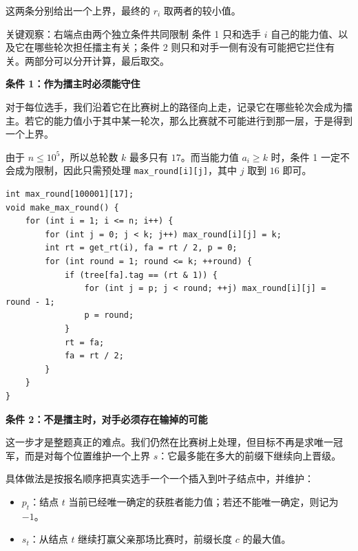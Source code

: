\documentclass{book}
\newcommand{\code}[1]{\colorbox{codebg}{\texttt{#1}}}  %
\begin{document}
    这两条分别给出一个上界，最终的 $r_i$ 取两者的较小值。

    \begin{keybox}{关键观察：右端点由两个独立条件共同限制}
    条件 1 只和选手 $i$ 自己的能力值、以及它在哪些轮次担任擂主有关；条件 2 则只和对手一侧有没有可能把它拦住有关。两部分可以分开计算，最后取交。
    \end{keybox}

    \par\medskip
    \noindent\textbf{条件 1：作为擂主时必须能守住}
    \par\medskip

    对于每位选手，我们沿着它在比赛树上的路径向上走，记录它在哪些轮次会成为擂主。若它的能力值小于其中某一轮次，那么比赛就不可能进行到那一层，于是得到一个上界。

    由于 $n\le 10^5$，所以总轮数 $k$ 最多只有 $17$。而当能力值 $a_i\ge k$ 时，条件 1 一定不会成为限制，因此只需预处理 \code{max\_round[i][j]}，其中 $j$ 取到 $16$ 即可。

  \begin{lstlisting}[style = code]
int max_round[100001][17];
void make_max_round() {
    for (int i = 1; i <= n; i++) {
        for (int j = 0; j < k; j++) max_round[i][j] = k;
        int rt = get_rt(i), fa = rt / 2, p = 0;
        for (int round = 1; round <= k; ++round) {
            if (tree[fa].tag == (rt & 1)) {
                for (int j = p; j < round; ++j) max_round[i][j] = round - 1;
                p = round;
            }
            rt = fa;
            fa = rt / 2;
        }
    }
}\end{lstlisting}

    \par\medskip
    \noindent\textbf{条件 2：不是擂主时，对手必须存在输掉的可能}
    \par\medskip

    这一步才是整题真正的难点。我们仍然在比赛树上处理，但目标不再是求唯一冠军，而是对每个位置维护一个上界 $s$：它最多能在多大的前缀下继续向上晋级。

    具体做法是按报名顺序把真实选手一个一个插入到叶子结点中，并维护：

    \begin{itemize}[leftmargin=2em,itemsep=1pt,topsep=2pt,parsep=0pt,partopsep=0pt]
        \item $p_t$：结点 $t$ 当前已经唯一确定的获胜者能力值；若还不能唯一确定，则记为 $-1$。
        \item $s_t$：从结点 $t$ 继续打赢父亲那场比赛时，前缀长度 $c$ 的最大值。
    \end{itemize}
\end{document}
